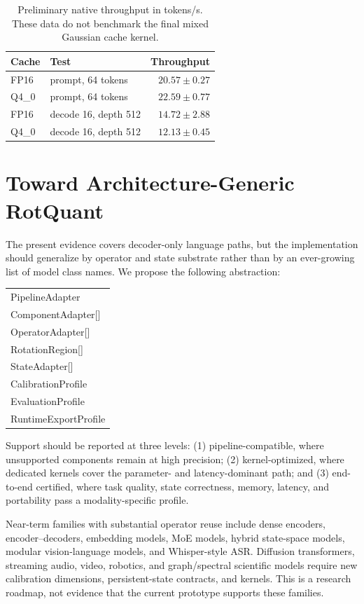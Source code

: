 \documentclass[10pt,twocolumn]{article}
\begin{document}
\begin{table}[t]
\centering
\small
\caption{Preliminary native throughput in tokens/s. These data do not benchmark
the final mixed Gaussian cache kernel.}
\label{tab:native}
\begin{tabular}{llr}
\toprule
Cache & Test & Throughput \\
\midrule
FP16 & prompt, 64 tokens & $20.57\pm0.27$ \\
Q4\_0 & prompt, 64 tokens & $22.59\pm0.77$ \\
FP16 & decode 16, depth 512 & $14.72\pm2.88$ \\
Q4\_0 & decode 16, depth 512 & $12.13\pm0.45$ \\
\bottomrule
\end{tabular}
\end{table}

\section{Toward Architecture-Generic RotQuant}

The present evidence covers decoder-only language paths, but the implementation
should generalize by operator and state substrate rather than by an ever-growing
list of model class names. We propose the following abstraction:

\begin{center}
\small\ttfamily
\begin{tabular}{@{}l@{}}
PipelineAdapter \\
\quad ComponentAdapter[] \\
\quad OperatorAdapter[] \\
\quad RotationRegion[] \\
\quad StateAdapter[] \\
\quad CalibrationProfile \\
\quad EvaluationProfile \\
\quad RuntimeExportProfile
\end{tabular}
\end{center}

Support should be reported at three levels: (1) pipeline-compatible, where
unsupported components remain at high precision; (2) kernel-optimized, where
dedicated kernels cover the parameter- and latency-dominant path; and (3)
end-to-end certified, where task quality, state correctness, memory, latency,
and portability pass a modality-specific profile.

Near-term families with substantial operator reuse include dense encoders,
encoder--decoders, embedding models, MoE models, hybrid state-space models,
modular vision-language models, and Whisper-style ASR. Diffusion transformers,
streaming audio, video, robotics, and graph/spectral scientific models require
new calibration dimensions, persistent-state contracts, and kernels. This is a
research roadmap, not evidence that the current prototype supports these
families.
\end{document}
